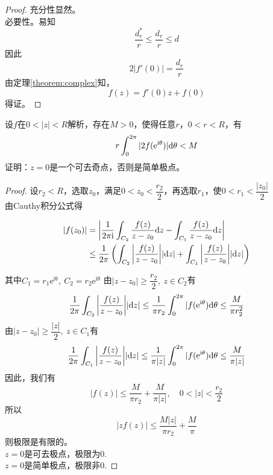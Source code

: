 \begin{proof}

    充分性显然。\\
    必要性。易知
    $$\dfrac{d_r^{*}}{r} \leq \dfrac{d_r}{r} \leq d$$
    因此
    $$2|f'(0)| = \dfrac{d_r}{r}$$
    由定理\ref{theorem:complex}知，
    $$f(z) = f'(0)z + f(0)$$
    得证。

\end{proof}

\begin{proposition}
    
    设$f$在$0 < |z| < R$解析，存在$M >0$，使得任意$r$，$0 < r < R$，有
    $$r \int_{0}^{2 \pi}{|2f(\mathrm{e^{i\theta}})|}\mathrm{d} \theta < M$$
    证明：$z=0$是一个可去奇点，否则是简单极点。

\end{proposition}

\begin{proof}
    
    设$r_2 < R$，选取$z_0$，满足$0 < z_0 < \dfrac{r_2}{2}$，再选取$r_1$，使$0 < r_1 < \dfrac{|z_0|}{2}$\\
    由\textup{Cauthy}积分公式得

    \begin{align*}
        |f(z_0)| & = \left| \dfrac{1}{2\mathrm{\pi i}} \int_{C_2}{\dfrac{f(z)}{z-z_0}}\mathrm{d} z - \int_{C_1}{\dfrac{f(z)}{z-z_0}}\mathrm{d} z \right|\\
        & \leq \dfrac{1}{2 \pi} \left(\int_{C_2}{\left|\dfrac{f(z)}{z-z_0}\right|}|\mathrm{d} z| + \int_{C_1}{\left|\dfrac{f(z)}{z-z_0}\right|}|\mathrm{d} z|\right)
    \end{align*}

    其中$C_1 = r_1\mathrm{e^{i\theta}},\ C_2 = r_2\mathrm{e^{i\theta}}$
    由$|z-z_0| \geq \dfrac{r_2}{2},\ z \in C_2$有
    $$ \dfrac{1}{2 \pi} \int_{C_2}{\left| \dfrac{f(z)}{z-z_0}\right|}|\mathrm{d} z| \leq \dfrac{1}{ \pi r_2}\int_{0}^{2 \pi}{|f(\mathrm{e}^{\mathrm{i}\theta})}\mathrm{d} \theta \leq \dfrac{M}{ \pi r_2^2}$$
    由$|z-z_0| \geq \dfrac{|z|}{2},\ z \in C_1$有
    $$ \dfrac{1}{2 \pi} \int_{C_1}{\left| \dfrac{f(z)}{z-z_0}\right|}|\mathrm{d} z| \leq \dfrac{1}{ \pi|z|}\int_{0}^{2 \pi}{|f(\mathrm{e}^{\mathrm{i}\theta})}\mathrm{d} \theta \leq \dfrac{M}{ \pi|z|}$$
    因此，我们有
    $$|f(z)| \leq \dfrac{M}{ \pi r_2} + \dfrac{M}{ \pi|z|},\quad 0 < |z| < \dfrac{r_2}{2}$$
    所以$$|zf(z)| \leq \dfrac{M|z|}{ \pi r_2} + \dfrac{M}{\pi}$$
    则极限是有限的。\\
    $z=0$是可去极点，极限为$0$.\\
    $z=0$是简单极点，极限非$0$.

\end{proof}

